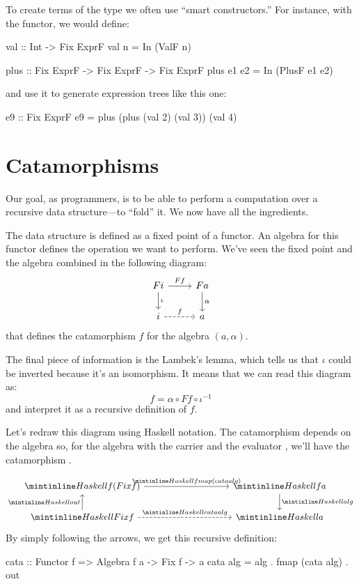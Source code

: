 \documentclass[DaoFP]{subfiles}
\begin{document}
To create terms of the type  we often use ``smart constructors.'' For instance, with the  functor, we would define:
\begin{haskell}
val :: Int -> Fix ExprF
val n = In (ValF n)

plus :: Fix ExprF -> Fix ExprF -> Fix ExprF
plus e1 e2 = In (PlusF e1 e2)
\end{haskell}
and use it to generate expression trees like this one:
\begin{haskell}
e9 :: Fix ExprF
e9 = plus (plus (val 2) (val 3)) (val 4)
\end{haskell}

\section{Catamorphisms}

Our goal, as programmers, is to be able to perform a computation over a recursive data structure---to ``fold'' it. We now have all the ingredients. 

The data structure is defined as a fixed point of a functor. An algebra for this functor defines the operation we want to perform. We've seen the fixed point and the algebra combined in the following diagram:
\[
 \begin{tikzcd}
 F i 
 \arrow[r, "F f"]
 \arrow[d, "\iota"]
 & F a
\arrow[d, "\alpha"]
 \\
 i
 \arrow[r, dashed, "f"]
 & a
  \end{tikzcd}
\]
that defines the catamorphism $f$ for the algebra $(a, \alpha)$.

The final piece of information is the Lambek's lemma, which tells us that $\iota$ could be inverted because it's an isomorphism. It means that we can read this diagram as:
\[ f = \alpha \circ F f \circ \iota^{-1} \]
and interpret it as a recursive definition of $f$. 

Let's redraw this diagram using Haskell notation. The catamorphism depends on the algebra so, for the algebra with the carrier  and the evaluator , we'll have the catamorphism .

\[
 \begin{tikzcd}
  \hask{f (Fix f)}
 \arrow[rrrr, "\hask{fmap (cata alg)}"]
 &&&& \hask{f a}
\arrow[d, "\hask{alg}"]
 \\
 \hask{Fix f}
 \arrow[u, "\hask{out}"]
 \arrow[rrrr, dashed, "\hask{cata alg}"]
 &&&& \hask{a}
  \end{tikzcd}
\]
By simply following the arrows, we get this recursive definition:
\begin{haskell}
cata :: Functor f => Algebra f a -> Fix f -> a
cata alg = alg . fmap (cata alg) . out
\end{haskell}
\end{document}
